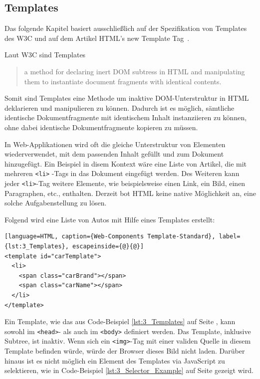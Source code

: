 \subsection{Templates}
\label{sec:3_WC_Templates}

Das folgende Kapitel basiert ausschließlich auf der Spezifikation von Templates des W3C \citereset \autocite[siehe][]{Weinstein.2013} und auf dem Artikel \glqq HTML's new Template Tag\grqq\ \citereset \autocite[siehe][]{BidelmanTemplate.2013}.

Laut W3C sind Templates
\begin{quote}
\glqq
  a method for declaring inert DOM subtress in HTML and manipulating them to instantiate document fragments with identical contents.
\grqq
\end{quote}
Somit sind Templates eine Methode um inaktive DOM-Unterstruktur in HTML deklarieren und manipulieren zu können. Dadurch ist es möglich, sämtliche identische Dokumentfragmente mit identischem Inhalt instanziieren zu können, ohne dabei identische Dokumentfragmente kopieren zu müssen.

In Web-Applikationen wird oft die gleiche Unterstruktur von Elementen wiederverwendet, mit dem passenden Inhalt gefüllt und zum Dokument hinzugefügt. Ein Beispiel in disem Kontext wäre eine Liste von Artikel, die mit mehreren \lstinline|<li>| -Tags in das Dokument eingefügt werden. Des Weiteren kann jeder \lstinline|<li>|-Tag weitere Elemente, wie beispielsweise einen Link, ein Bild, einen Paragraphen, etc., enthalten. Derzeit bot HTML keine native Möglichkeit an, eine solche Aufgabenstellung zu lösen.

Folgend wird eine Liste von Autos mit Hilfe eines Templates erstellt:
\begin{lstlisting}[language=HTML, caption={Web-Components Template-Standard}, label={lst:3_Templates}, escapeinside={@}{@}]
<template id="carTemplate">
  <li>
    <span class="carBrand"></span>
    <span class="carName"></span>
  </li>
</template>
\end{lstlisting}

Ein Template, wie das aus Code-Beispiel \ref{lst:3_Templates} auf Seite \pageref{lst:3_Templates}, kann sowohl im \lstinline|<head>|- als auch im \lstinline|<body>| definiert werden. Das Template, inklusive Subtree, ist inaktiv. Wenn sich ein \lstinline|<img>|-Tag mit einer validen Quelle in diesem Template befinden würde, würde der Browser dieses Bild nicht laden. Darüber hinaus ist es nicht möglich ein Element des Templates via JavaScript zu selektieren, wie in Code-Beispiel \ref{lst:3_Selector_Example} auf Seite \pageref{lst:3_Selector_Example} gezeigt wird.

